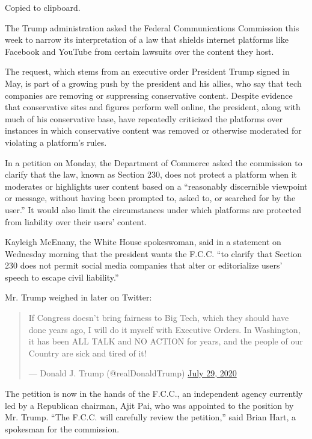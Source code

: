 Copied to clipboard.

The Trump administration asked the Federal Communications Commission
this week to narrow its interpretation of a law that shields internet
platforms like Facebook and YouTube from certain lawsuits over the
content they host.

The request, which stems from an executive order President Trump signed
in May, is part of a growing push by the president and his allies, who
say that tech companies are removing or suppressing conservative
content. Despite evidence that conservative sites and figures perform
well online, the president, along with much of his conservative base,
have repeatedly criticized the platforms over instances in which
conservative content was removed or otherwise moderated for violating a
platform's rules.

In a petition on Monday, the Department of Commerce asked the commission
to clarify that the law, known as Section 230, does not protect a
platform when it moderates or highlights user content based on a
``reasonably discernible viewpoint or message, without having been
prompted to, asked to, or searched for by the user.'' It would also
limit the circumstances under which platforms are protected from
liability over their users' content.

Kayleigh McEnany, the White House spokeswoman, said in a statement on
Wednesday morning that the president wants the F.C.C. ``to clarify that
Section 230 does not permit social media companies that alter or
editorialize users' speech to escape civil liability.''

Mr. Trump weighed in later on Twitter:

\begin{quote}
If Congress doesn't bring fairness to Big Tech, which they should have
done years ago, I will do it myself with Executive Orders. In
Washington, it has been ALL TALK and NO ACTION for years, and the people
of our Country are sick and tired of it!

--- Donald J. Trump (@realDonaldTrump)
\href{https://twitter.com/realDonaldTrump/status/1288506554585505793?ref_src=twsrc\%5Etfw}{July
29, 2020}
\end{quote}

The petition is now in the hands of the F.C.C., an independent agency
currently led by a Republican chairman, Ajit Pai, who was appointed to
the position by Mr. Trump. ``The F.C.C. will carefully review the
petition,'' said Brian Hart, a spokesman for the commission.

